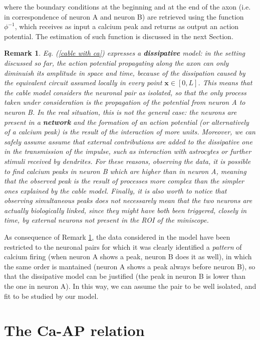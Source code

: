 \documentclass[12pt, a4paper]{report}
\newtheorem{remark}{Remark}
\begin{document}
where the boundary conditions at the beginning and at the end of the axon (i.e. in correspondence of neuron A and neuron B) are retrieved using the  function $\phi^{-1}$, which receives as input a  calcium peak  and returns as output an action potential. The estimation of such function is discussed in the next Section.

\begin{remark}\label{remark cc}
	Eq. (\ref{cable with ca}) expresses a \textbf{dissipative} model: in the setting discussed so far, the action potential propagating along the axon can only diminuish its amplitude in space and time, because of the dissipation caused by the equivalent circuit assumed locally in every point $\textbf{x} \in [0,L]$. This means that the cable model considers the neuronal pair as isolated, so that the only process taken under consideration is the propagation of the potential from neuron A to neuron B. In the real situation, this is not the general case: the neurons are present in a \textbf{network} and the formation of an action potential (or alternatively of a calcium peak) is the result of the interaction of more units. Moreover, we can safely assume assume that external contributions are added to the dissipative one in the transmission of the impulse, such as interaction with astrocytes or further stimuli received by dendrites. For these reasons, observing the data, it is possible to find calcium peaks in neuron B which are higher than in neuron A, meaning that the observed peak is the result of processes more complex than the simpler ones explained by the cable model. Finally, it is also worth to notice that observing simultaneous peaks does not necessarely mean that the two neurons are actually biologically linked, since they might have both  been triggered, closely in time, by external neurons not present in the ROI  of the miniscope.
\end{remark}


As consequence of Remark \ref{remark cc}, the data considered in the model have been restricted to the neuronal pairs for which it was clearly identified a \textit{pattern} of calcium firing (when neuron A shows a peak, neuron B does it as well), in which the same order is mantained (neuron A shows a peak always before neuron B), so that the dissipative model can be justified (the peak in neuron B is lower than the one in neuron A). In this way, we can assume  the pair to be well isolated, and fit to be studied by our model.

\section{The Ca-AP relation}
\end{document}
